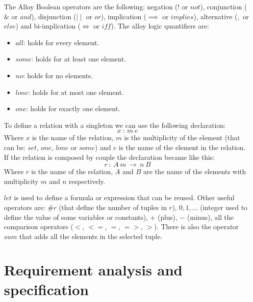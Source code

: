 \documentclass[12pt, a4paper]{report}
\theoremstyle{remark}
\begin{document}
    The Alloy Boolean operators are the following: negation ($!$ or $not$), conjunction ($\&$ or $and$), disjunction ($\mid \mid$ or $or$), implication ($\implies$ or $implies$), alternative ($,$ or $else$) and bi-implication ($\iff$ or $iff$). The alloy logic quantifiers are: 
    \begin{itemize}
        \item $all$: holds for every element.
        \item $some$: holds for at least one element.
        \item $no$: holds for no elements.
        \item $lone$: holds for at most one element.
        \item $one$: holds for exactly one element.
    \end{itemize}
    To define a relation with a singleton we can use the following declaration: 
    \[x \: : \: m \: e\]
    Where $x$ is the name of the relation, $m$ is the multiplicity of the element (that can be: $set$, $one$, $lone$ or $some$) and $e$ is the name of the element in the relation. If the relation is composed by couple the declaration became like this: 
    \[r \: : \: A \: m \: \rightarrow \: n \: B\]
    Where $r$ is the name of the relation, $A$ and $B$ are the name of the elements with multiplicity $m$ and $n$ respectively.
    \par
    $let$ is used to define a formula or expression that can be reused. Other useful operators are: $\# r$ (that define the number of tuples in $r$), $0,1,\dots$ (integer used to define the value of some variables or constants), $+$ (plus), $-$ (minus), all the comparison operators ($<$, $<=$, $=$, $=>$, $>$). There is also the operator $sum$ that adds all the elements in the selected tuple. 
    
\newpage

\chapter{Requirement analysis and specification}
\end{document}
